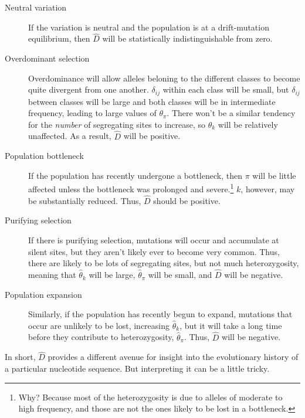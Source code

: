 \begin{description}

\item[Neutral variation] If the variation is neutral and the
  population is at a drift-mutation equilibrium, then $\hat D$ will be
  statistically indistinguishable from zero.

\item[Overdominant selection] Overdominance will allow alleles
  beloning to the different classes to become quite divergent from one
  another. $\delta_{ij}$ within each class will be small, but
  $\delta_{ij}$ between classes will be large and both classes will be
  in intermediate frequency, leading to large values of
  $\theta_\pi$. There won't be a similar tendency for the {\it
  number\/} of segregating sites to increase, so $\theta_k$ will be
  relatively unaffected. As a result, $\hat D$ will be positive.

\item[Population bottleneck] If the population has recently undergone
  a bottleneck, then $\pi$ will be little affected unless the
  bottleneck was prolonged and severe.\footnote{Why? Because most of
    the heterozygosity is due to alleles of moderate to high
    frequency, and those are not the ones likely to be lost in a
    bottleneck.}  $k$, however, may be substantially reduced. Thus,
  $\hat D$ should be positive.

\item[Purifying selection] If there is purifying selection, mutations
  will occur and accumulate at silent sites, but they aren't likely
  ever to become very common. Thus, there are likely to be lots of
  segregating sites, but not much heterozygosity, meaning that
  $\hat\theta_k$ will be large, $\hat\theta_\pi$ will be small, and
  $\hat D$ will be negative.

\item[Population expansion] Similarly, if the population has recently
  begun to expand, mutations that occur are unlikely to be lost,
  increasing $\hat\theta_k$, but it will take a long time before they
  contribute to heterozygosity, $\hat\theta_\pi$. Thus, $\hat D$ will
  be negative.

\end{description}

In short, $\hat D$ provides a different avenue for insight into the
evolutionary history of a particular nucleotide sequence. But
interpreting it can be a little tricky.

